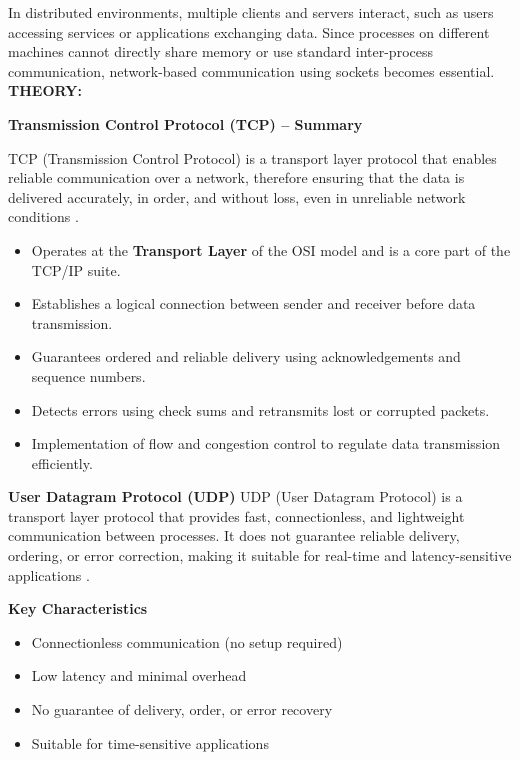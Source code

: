 \documentclass[a4paper,12pt]{article}
\begin{document}
\noindent
In distributed environments, multiple clients and servers interact, such as users accessing services or applications exchanging data. Since processes on different machines cannot directly share memory or use standard inter-process communication, network-based communication using sockets becomes essential.\\

\noindent
\textbf{THEORY: }

\noindent 
\textbf{Transmission Control Protocol (TCP) -- Summary}

\noindent
TCP (Transmission Control Protocol) is a transport layer protocol that enables reliable communication over a network, therefore ensuring that the data is delivered accurately, in order, and without loss, even in unreliable network conditions \cite{gfg_tcp_protocol}.

\begin{itemize}
    \item Operates at the \textbf{Transport Layer} of the OSI model and is a core part of the TCP/IP suite.
    \item Establishes a logical connection between sender and receiver before data transmission.
    \item Guarantees ordered and reliable delivery using acknowledgements and sequence numbers.
    \item Detects errors using check sums and retransmits lost or corrupted packets.
    \item Implementation of  flow and congestion control to regulate data transmission efficiently.
\end{itemize}
\noindent 
\textbf{ User Datagram Protocol (UDP)}
\noindent
UDP (User Datagram Protocol) is a transport layer protocol that provides fast, connectionless, and lightweight communication between processes. It does not guarantee reliable delivery, ordering, or error correction, making it suitable for real-time and latency-sensitive applications \cite{gfg_udp_protocol}.

\noindent \textbf{Key Characteristics}
\begin{itemize}
    \item Connectionless communication (no setup required)
    \item Low latency and minimal overhead
    \item No guarantee of delivery, order, or error recovery
    \item Suitable for time-sensitive applications
\end{itemize}
\end{document}
